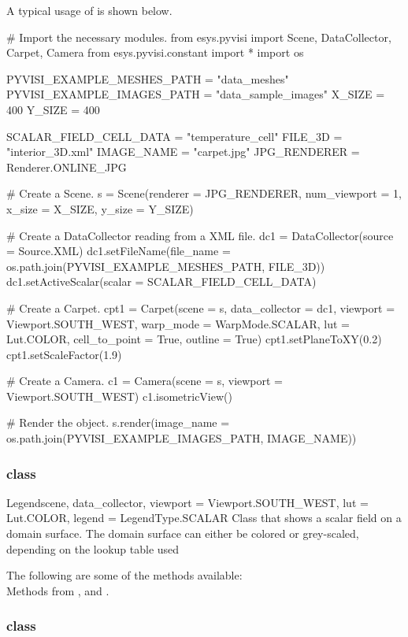 A typical usage of \Carpet is shown below.

\begin{python}
# Import the necessary modules.
from esys.pyvisi import Scene, DataCollector, Carpet, Camera
from esys.pyvisi.constant import *
import os

PYVISI_EXAMPLE_MESHES_PATH = "data_meshes"
PYVISI_EXAMPLE_IMAGES_PATH = "data_sample_images"
X_SIZE = 400
Y_SIZE = 400

SCALAR_FIELD_CELL_DATA = "temperature_cell"
FILE_3D = "interior_3D.xml"
IMAGE_NAME = "carpet.jpg"
JPG_RENDERER = Renderer.ONLINE_JPG

# Create a Scene.
s = Scene(renderer = JPG_RENDERER, num_viewport = 1, x_size = X_SIZE, 
        y_size = Y_SIZE)

# Create a DataCollector reading from a XML file.
dc1 = DataCollector(source = Source.XML)
dc1.setFileName(file_name = os.path.join(PYVISI_EXAMPLE_MESHES_PATH, FILE_3D))
dc1.setActiveScalar(scalar = SCALAR_FIELD_CELL_DATA)

# Create a Carpet.
cpt1 = Carpet(scene = s, data_collector = dc1, viewport = Viewport.SOUTH_WEST, 
        warp_mode = WarpMode.SCALAR, lut = Lut.COLOR, cell_to_point = True,
        outline = True)
cpt1.setPlaneToXY(0.2)
cpt1.setScaleFactor(1.9)

# Create a Camera.
c1 = Camera(scene = s, viewport = Viewport.SOUTH_WEST)
c1.isometricView()

# Render the object.
s.render(image_name = os.path.join(PYVISI_EXAMPLE_IMAGES_PATH, IMAGE_NAME))
\end{python}

\subsubsection{\Legend class}

\begin{classdesc}{Legend}{scene, data_collector, 
viewport = Viewport.SOUTH_WEST, lut = Lut.COLOR, legend = LegendType.SCALAR}
Class that shows a scalar field on a domain surface. The domain surface
can either be colored or grey-scaled, depending on the lookup table used
\end{classdesc}

The following are some of the methods available:\\
Methods from \ActorThreeD, \ScalarBar and \DataSetMapper.

\subsubsection{\Rectangle class}

